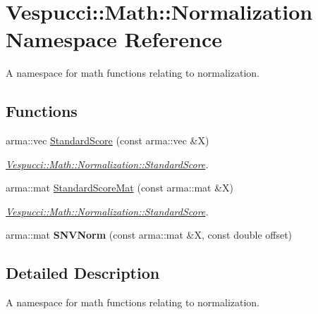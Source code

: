 \hypertarget{namespace_vespucci_1_1_math_1_1_normalization}{\section{Vespucci\+:\+:Math\+:\+:Normalization Namespace Reference}
\label{namespace_vespucci_1_1_math_1_1_normalization}
}


A namespace for math functions relating to normalization.  


\subsection*{Functions}
\begin{DoxyCompactItemize}
\item 
arma\+::vec \hyperlink{namespace_vespucci_1_1_math_1_1_normalization_a8a39e3540561860b69ec95d8d33bfac0}{Standard\+Score} (const arma\+::vec \&X)
\begin{DoxyCompactList}\small\item\em \hyperlink{namespace_vespucci_1_1_math_1_1_normalization_a8a39e3540561860b69ec95d8d33bfac0}{Vespucci\+::\+Math\+::\+Normalization\+::\+Standard\+Score}. \end{DoxyCompactList}\item 
arma\+::mat \hyperlink{namespace_vespucci_1_1_math_1_1_normalization_a00d08eef3567d3420e40dda235c38590}{Standard\+Score\+Mat} (const arma\+::mat \&X)
\begin{DoxyCompactList}\small\item\em \hyperlink{namespace_vespucci_1_1_math_1_1_normalization_a8a39e3540561860b69ec95d8d33bfac0}{Vespucci\+::\+Math\+::\+Normalization\+::\+Standard\+Score}. \end{DoxyCompactList}\item 
\hypertarget{namespace_vespucci_1_1_math_1_1_normalization_a489d156fa1ddbca14b1e6e75f04e93fa}{arma\+::mat {\bfseries S\+N\+V\+Norm} (const arma\+::mat \&X, const double offset)}\label{namespace_vespucci_1_1_math_1_1_normalization_a489d156fa1ddbca14b1e6e75f04e93fa}

\end{DoxyCompactItemize}


\subsection{Detailed Description}
A namespace for math functions relating to normalization. 


